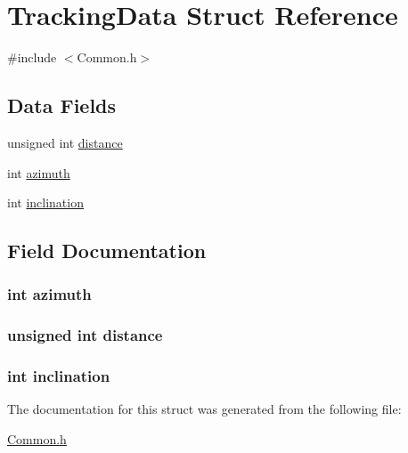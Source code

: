 \hypertarget{struct_tracking_data}{\section{Tracking\+Data Struct Reference}
\label{struct_tracking_data}
}


{\ttfamily \#include $<$Common.\+h$>$}

\subsection*{Data Fields}
\begin{DoxyCompactItemize}
\item 
unsigned int \hyperlink{struct_tracking_data_a4bb47863775a37236bda65273c01b275}{distance}
\item 
int \hyperlink{struct_tracking_data_a866e78e12cb32dcaf1ded89bda8be8f5}{azimuth}
\item 
int \hyperlink{struct_tracking_data_af308b9934394c8bcf7614eb1df2d863f}{inclination}
\end{DoxyCompactItemize}


\subsection{Field Documentation}
\hypertarget{struct_tracking_data_a866e78e12cb32dcaf1ded89bda8be8f5}{
\subsubsection[{azimuth}]{\setlength{\rightskip}{0pt plus 5cm}int azimuth}}\label{struct_tracking_data_a866e78e12cb32dcaf1ded89bda8be8f5}
\hypertarget{struct_tracking_data_a4bb47863775a37236bda65273c01b275}{
\subsubsection[{distance}]{\setlength{\rightskip}{0pt plus 5cm}unsigned int distance}}\label{struct_tracking_data_a4bb47863775a37236bda65273c01b275}
\hypertarget{struct_tracking_data_af308b9934394c8bcf7614eb1df2d863f}{
\subsubsection[{inclination}]{\setlength{\rightskip}{0pt plus 5cm}int inclination}}\label{struct_tracking_data_af308b9934394c8bcf7614eb1df2d863f}


The documentation for this struct was generated from the following file\+:\begin{DoxyCompactItemize}
\item 
\hyperlink{_common_8h}{Common.\+h}\end{DoxyCompactItemize}
